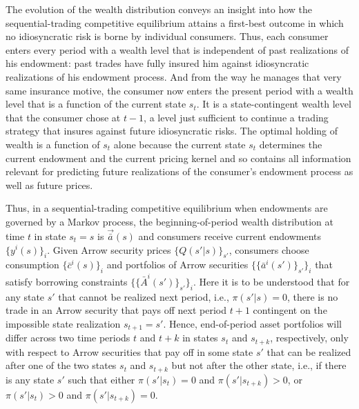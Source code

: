 The evolution of the wealth distribution conveys an
insight into how the sequential-trading competitive equilibrium
attains a first-best outcome in which no idiosyncratic risk is
borne by individual consumers. Thus, each consumer
enters every period with a wealth level that is independent of
past realizations of his endowment: past trades have
fully insured him against  idiosyncratic realizations of his
endowment process. And from the way he manages  that very same insurance motive, the consumer
now enters the present period with a wealth level that is a
function of the current state $s_t$. It is a state-contingent
wealth level that  the consumer chose at $t-1$, a level  just sufficient to
continue  a trading strategy that insures against future
idiosyncratic risks. The optimal holding of wealth is  a function
 of $s_t$ alone because the current state $s_t$ determines the
current endowment and the current pricing kernel  and so contains all information
relevant for predicting
future realizations of the consumer's endowment process as well as future prices.


Thus, in a sequential-trading competitive 
equilibrium when endowments are governed by a 
Markov process, the beginning-of-period wealth
distribution at time $t$ in state $s_t=s$
is $\vec {\bar a}(s)$ and consumers receive current
endowments $\{y^i(s)\}_i$. Given Arrow security
prices $\{Q(s'|s)\}_{s'}$, consumers choose
consumption $\{\bar c^i(s)\}_i$ and portfolios
of Arrow securities $\{\{\bar a^i(s')\}_{s'}\}_i$ 
that satisfy borrowing constraints 
$\{\{\bar A^i(s')\}_{s'}\}_i$.
Here it is to be understood that for any state $s'$
that cannot be realized next period, i.e.,
$\pi(s'|s)=0$, there is no trade in an Arrow
security that pays off next period $t+1$ 
contingent on the impossible state realization
$s_{t+1}=s'$. 
Hence, end-of-period asset portfolios will differ 
across two time periods $t$ and $t+k$ in states 
$s_t$ and $s_{t+k}$, respectively, only with
respect to Arrow securities that pay off in
some state $s'$ that can be realized
after one of the two states $s_t$ and
$s_{t+k}$ but not after the other state, i.e.,
if there is any state $s'$ such that
either $\pi(s'|s_t)=0$ and $\pi(s'|s_{t+k})>0$, 
or $\pi(s'|s_t)>0$ and 
$\pi(s'|s_{t+k})=0$.

